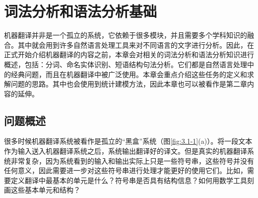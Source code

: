 
%


\renewcommand\figurename{图}%
\renewcommand\tablename{表}%

\chapter{词法分析和语法分析基础} \label{chapter_3}

\parinterval 机器翻译并非是一个孤立的系统，它依赖于很多模块，并且需要多个学科知识的融合。其中就会用到许多自然语言处理工具来对不同语言的文字进行分析。因此，在正式开始介绍机器翻译的内容之前，本章会对相关的词法分析和语法分析知识进行概述，包括：分词、命名实体识别、短语结构句法分析。它们都是自然语言处理中的经典问题，而且在机器翻译中被广泛使用。本章会重点介绍这些任务的定义和求解问题的思路。其中也会使用到统计建模方法，因此本章也可以被看作是第二章内容的延伸。


\section{问题概述}

\parinterval 很多时候机器翻译系统被看作是孤立的“黑盒”系统（图\ref{fig:3.1-1}(a)）。将一段文本作为输入送入机器翻译系统之后，系统输出翻译好的译文。但是真实的机器翻译系统非常复杂，因为系统看到的输入和输出实际上只是一些符号串，这些符号并没有任何意义，因此需要进一步对这些符号串进行处理才能更好的使用它们。比如，需要定义翻译中最基本的单元是什么？符号串是否具有结构信息？如何用数学工具刻画这些基本单元和结构？

